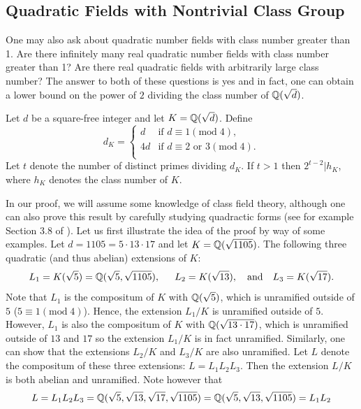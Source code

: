\documentclass{book}
\begin{document}
\subsection{Quadratic Fields with Nontrivial Class Group}
One may also ask about quadratic number fields with class number greater than
1.  Are there infinitely many real quadratic number fields with class number
greater than 1?  Are there real quadratic fields with arbitrarily large class
number?  The answer to both of these questions is yes and in fact, one can
obtain a lower bound on the power of $2$ dividing the class number
of $\mathbb{Q}(\sqrt{d})$.
\begin{proposition}
Let $d$ be a square-free integer and let $K = \mathbb{Q}(\sqrt{d})$.
Define
$$
d_K = \left\{\begin{array}{rl}
d & \text{if  } d \equiv 1 (\mathrm{mod} \; 4), \\
4d & \text{if  } d \equiv 2 \text{ or } 3 (\mathrm{mod} \; 4). \\
\end{array}\right.
$$
Let $t$ denote the number of distinct primes dividing $d_K$.
If $t > 1$ then $2^{t-2}|h_K$, where $h_K$ denotes the class number of $K$.
\end{proposition}
In our proof, we will assume some knowledge of class field theory, although
one can also prove this result by carefully studying quadractic forms (see for
example Section 3.8 of \cite{borevich-shafarevich}).
Let us first illustrate the idea of the proof by way of some examples.
Let $d = 1105 = 5\cdot 13 \cdot 17$ and let $K = \mathbb{Q}(\sqrt{1105})$.  The
following three quadratic (and thus abelian) extensions of $K$:
$$
L_1 = K(\sqrt{5}) = \mathbb{Q}(\sqrt{5}, \sqrt{1105}), \hspace{15pt}
L_2 = K(\sqrt{13}),\hspace{10pt} \text{and} \hspace{10pt} L_3 = K(\sqrt{17}).
$$
Note that $L_1$ is the compositum of $K$ with $\mathbb{Q}(\sqrt{5})$, which is
unramified outside of $5$ ($5 \equiv 1 (\mathrm{mod} \; 4)$).  Hence, the
extension $L_1/K$ is unramified outside of $5$.  However, $L_1$ is also the
compositum of $K$ with $\mathbb{Q}(\sqrt{13\cdot 17})$, which is unramified outside of
$13$ and $17$ so the extension $L_1/K$ is in fact unramified.  Similarly, one
can show that the extensions $L_2/K$ and $L_3/K$ are also unramified.  Let
$L$ denote the compositum of these three extensions: $L = L_1 L_2 L_3$.  Then
the extension $L/K$ is both abelian and unramified.  Note however that
$$
L = L_1L_2L_3 = \mathbb{Q}(\sqrt{5}, \sqrt{13}, \sqrt{17}, \sqrt{1105}) =
\mathbb{Q}(\sqrt{5},\sqrt{13},\sqrt{1105}) = L_1L_2
$$
\end{document}
